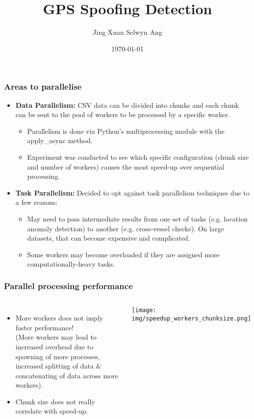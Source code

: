 \documentclass{beamer}
\title{GPS Spoofing Detection}
\author{Jing Xuan Selwyn Ang}
\institute{Vilnius University, National University of Singapore}
\date{\today}
\begin{document}
\frame{\titlepage}

\begin{frame}
\frametitle{Areas to parallelise}
\begin{itemize}
    \item \textbf{Data Parallelism:} CSV data can be divided into chunks and each chunk can be sent to the pool of workers to be processed by a specific worker.
    \begin{itemize}
        \item Parallelism is done via Python's multiprocessing module with the apply\_async method.
        \item Experiment was conducted to see which specific configuration (chunk size and number of workers) causes the most speed-up over sequential processing.
    \end{itemize}
    \item \textbf{Task Parallelism:} Decided to opt against task parallelism techniques due to a few reasons:
    \begin{itemize}
        \item May need to pass intermediate results from one set of tasks (e.g. location anomaly detection) to another (e.g. cross-vessel checks). On large datasets, that can become expensive and complicated.
        \item Some workers may become overloaded if they are assigned more computationally-heavy tasks.
    \end{itemize}
\end{itemize}
\end{frame}

\begin{frame}
    \frametitle{Parallel processing performance}
    \begin{columns}
        \begin{itemize}
            \item More workers does not imply faster performance! \\ 
            (More workers may lead to increased overhead due to spawning of more processes, increased splitting of data \& concatenating of data across more workers).
            \item Chunk size does not really correlate with speed-up.
        \end{itemize}
    
        \centering
        \texttt{[image: img/speedup\_workers\_chunksize.png]}
    \end{columns}
    \end{frame}
    
\end{document}
